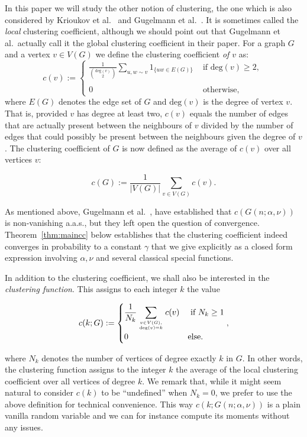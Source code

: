 In this paper we will study the other notion of clustering, the one which is also considered by Krioukov et al.~\cite{krioukov2010hyperbolic} and
Gugelmann et al.~\cite{gugelmann2012random}. 
It is sometimes called the {\em local} clustering coefficient, although we should point out that Gugelmann et al.~actually
call it the global clustering coefficient in their paper.
For a graph $G$ and a vertex $v\in V(G)$ we define the clustering coefficient {\em of $v$} as:
\[
	c(v) := \left\{\begin{array}{cl}
		\displaystyle \frac{1}{{\text{deg}(v)\choose 2}} \sum_{u,w\sim v} 1_{\{uw \in E(G)\}} 
			& \text{ if $\text{deg}(v) \geq 2$, }\\
		& \\
        0 & \text{ otherwise,}
        \end{array}\right.
\]
where $E(G)$ denotes the edge set of $G$ and $\text{deg}(v)$ is the degree of vertex $v$. That is, provided $v$ has degree at least two, $c(v)$ equals the number of edges that are actually present between the neighbours  of $v$ divided by the
number of edges that could possibly be present between the neighbours given the degree of $v$.
The clustering coefficient of $G$ is now defined as the average of $c(v)$ over all vertices $v$:

$$ c(G) := \frac{1}{|V(G)|} \sum_{v\in V(G)} c(v). $$

As mentioned above, Gugelmann et al.~\cite{gugelmann2012random}, have established that $c(G(n;\alpha,\nu))$ is non-vanishing a.a.s., but they left 
open the question of convergence.
Theorem~\ref{thm:maincc} below establishes that the clustering coefficient indeed converges in probability to a constant
$\gamma$ that we give explicitly as a closed form expression involving $\alpha,\nu$ and several classical special functions.

In addition to the clustering coefficient, we shall also be interested in the {\em clustering function}.
This assigns to each integer $k$ the value

$$ c(k; G) := \begin{cases}
		\displaystyle \frac{1}{N_k} \sum_{v \in V(G), \atop \text{deg}(v)=k}  c(v)  &\mbox{ if } N_k \ge 1\\
		0 &\mbox{else.}
	\end{cases},
	$$
	
\noindent
where $N_k$ denotes the number of vertices of degree exactly $k$ in $G$.
In other words, the clustering function assigns to the integer $k$ the average of the local clustering coefficient over all vertices of degree $k$. 
We remark that, while it might seem natural to consider $c(k)$ to be ``undefined'' when $N_k=0$, we prefer to use the above definition for technical 
convenience.  This way $c(k; G(n;\alpha,\nu) )$ is a plain vanilla random variable and we can for instance compute its moments without any issues.

